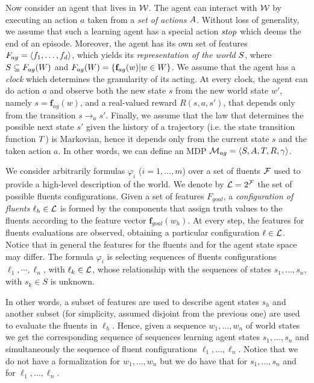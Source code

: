 Now consider an agent that lives in $\mathcal{W}$. The agent can interact with $\mathcal{W}$ by executing an action $a$ taken from a \emph{set of actions} $A$. Without loss of generality, we assume that such a learning agent has a special action $\mathit{stop}$ which deems the end of an episode.
Moreover, the agent has its own set of features $F_{ag} = \langle f_1, \dots, f_d \rangle$, which yields its \emph{representation of the world} $S$, where $S \subseteq F_{ag}(W)$ and $F_{ag}(W) = \{\mathbf{f}_{ag}(w) | w \in W\}$. We assume that the agent has a \emph{clock} which determines the granularity of its acting. At every clock, the agent can do action $a$ and observe both the new state $s$ from the new world state $w'$, namely $s = \mathbf{f}_{ag}(w)$, and a real-valued reward $R(s,a,s')$, that depends only from the transition $s\to_a s'$.
Finally, we assume that the law that determines the possible next state $s'$ given the history of a trajectory (i.e. the state transition function $T$) is Markovian, hence it depends only from the current state $s$ and the taken action $a$. 
In other words, we can define an MDP $\mathcal{M}_{ag} = \langle S, A, T, R, \gamma \rangle$.

We consider arbitrarily \LLf formulas $\varphi_i$
($i=1,\ldots,m$) over a set of fluents $\mathcal{F}$ used to provide a high-level description of the world. We denote by $\mathcal{L}=2^{\mathcal{F}}$ the set of possible fluents configurations. 
Given a set of features $F_{goal}$, a \emph{configuration of fluents} $\ell_h \in \mathcal{L}$ is formed by the components that assign truth values to the fluents according to
the feature vector $\mathbf{f}_{goal}(w_h)$. At every step, the features for fluents evaluations are observed, obtaining a particular configuration $\ell\in\mathcal{L}$. Notice that in general the features for the fluents and for the agent state space may differ. The formula $\varphi_i$ is
selecting sequences of fluents configurations $\ell_1,\cdots,\ell_n$,
with $\ell_k\in \mathcal{L}$, whose relationship with the sequences of states
$s_1,\ldots, s_n$, with $s_k \in S$ is unknown.

 In other words, a subset of features are used to describe agent states $s_h$ and another  subset (for simplicity, assumed disjoint from the previous one) are used to evaluate the fluents in $\ell_h$.
 Hence, given a sequence $w_1,\ldots,w_n$ of
 world states we get the corresponding sequence of sequences learning
 agent states $s_1,\ldots,s_n$ and simultaneously the sequence of fluent
 configurations $\ell_1,\ldots,\ell_n$.  Notice that we do not have a
 formalization for $w_1,\ldots,w_n$ but we do have that for $s_1,\ldots,s_n$
 and for $\ell_1,\ldots,\ell_n$. 



